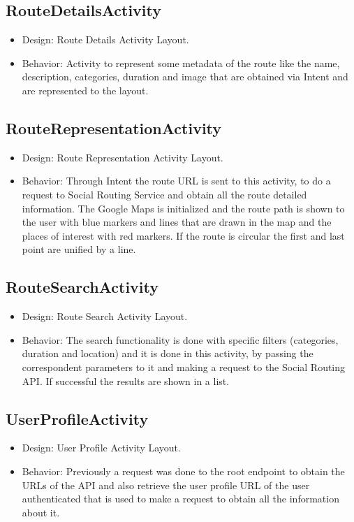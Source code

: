 \subsection{RouteDetailsActivity}
\begin{itemize}
        \item Design: Route Details Activity Layout.\cite{routedetailsactivitylayout}
        \item Behavior: Activity to represent some metadata of the route like the name, description, categories, duration and image that are obtained via Intent and are represented to the 
        layout.
\end{itemize}

\subsection{RouteRepresentationActivity} \label{routerepresentationactivity}
\begin{itemize}
        \item Design: Route Representation Activity Layout.\cite{routerepresentationactivitylayout}
        \item Behavior: Through Intent the route URL\cite{url} is sent  to this activity, to do a request to Social Routing Service and obtain all the route detailed information. The Google Maps
        is initialized and the route path is shown to the user with blue markers and lines that are drawn in the map and the places of interest with red markers. If the route is circular the first and last point are unified by a line.
\end{itemize}

\subsection{RouteSearchActivity}
\begin{itemize}
        \item Design: Route Search Activity Layout.\cite{routesearchactivitylayout}
        \item Behavior: The search functionality is done with specific filters (categories, duration and location) and it is done in this activity, by passing the correspondent parameters to it
        and making a request to the Social Routing API. If successful the results are shown in a list.
\end{itemize}

\subsection{UserProfileActivity} \label{userprofileactivity}
\begin{itemize}
        \item Design: User Profile Activity Layout.\cite{userprofilectivitylayout}
        \item Behavior: Previously a request was done to the root endpoint to obtain the URLs of the API and also retrieve the user profile URL of the user authenticated that is used to make 
a request to obtain all the information about it.
\end{itemize}


